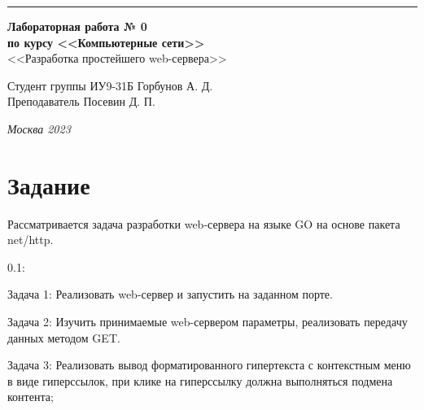 \documentclass[a4paper, 14pt]{extarticle}
\begin{document}
\begin{titlepage}
\vspace*{-16pt}
\hspace{30pt}\rule{0.866\textwidth}{0.4pt}
  
\vspace{11em}

\begin{center}
\Large {\bf Лабораторная работа № 0} \\ 
\large {\bf по курсу <<Компьютерные сети>>} \\
\large <<Разработка простейшего web-сервера>> 
\end{center}\normalsize

\vspace{8em}


\begin{flushright}
  {Студент группы ИУ9-31Б Горбунов А. Д. \hspace*{15pt}\\ 
  \vspace{2ex}
  Преподаватель Посевин Д. П.\hspace*{15pt}}
\end{flushright}

\bigskip

\vfill
 

\begin{center}
\textsl{Москва 2023}
\end{center}
\end{titlepage}

\renewcommand{\ttdefault}{pcr}

\setlength{\tabcolsep}{3pt}
\newpage
\setcounter{page}{2}

\section{Задание}\label{Sect::task}
    Рассматривается задача разработки web-сервера на языке GO на основе пакета net/http.
    
    0.1:
    
    Задача 1: Реализовать web-сервер и запустить на заданном порте.
    
    Задача 2: Изучить принимаемые web-сервером параметры, реализовать передачу данных методом GET.
    
    Задача 3: Реализовать вывод форматированного гипертекста с контекстным меню в виде гиперссылок, при клике на гиперссылку должна выполняться подмена контента;
    
\end{document}
